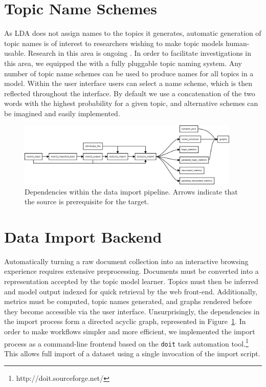 \documentclass[11pt]{article}
\begin{document}
\section{Topic Name Schemes}
As LDA does not assign names to the topics it generates, automatic generation of
topic names is of interest to researchers wishing to make topic models
human-usable. Research in this area is ongoing \cite{Mei2007,Lau2010}. In order to
facilitate investigations in this area, we equipped the \tool{} with a
fully pluggable topic naming system. Any number of topic name schemes can be
used to produce names for all topics in a model. Within the user interface
users can select a name scheme, which is then reflected throughout the
interface. By default we use a concatenation of the two
words with the highest probability for a given topic, and alternative schemes
can be imagined and easily implemented.%

\begin{figure}[ht]
 \centering
 \includegraphics[width=400px,keepaspectratio=true]{./build_flowchart2.png}
 \caption{Dependencies within the data import pipeline. Arrows indicate that the source is prerequisite for the target.}
 \label{fig:build_flowchart}
\end{figure}
\section{Data Import Backend}
Automatically turning a raw document collection into an interactive browsing
experience requires extensive preprocessing. Documents must be converted into a
representation accepted by the topic model learner. Topics must then be inferred
and model output indexed for quick retrieval by the web front-end.
Additionally, metrics must be computed, topic names generated, and graphs rendered
before they become accessible via the user interface. Unsurprisingly, the dependencies
in the import process form a directed acyclic graph, represented in Figure~\ref{fig:build_flowchart}.
In order to make workflows simpler and more efficient, we implemented
the import process as a command-line frontend based on the \texttt{doit}
task automation tool.\footnote{http://doit.sourceforge.net/} This allows full
import of a dataset using a single invocation of the import script.
\end{document}
